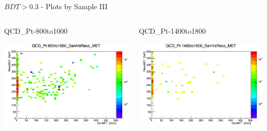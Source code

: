 \documentclass[8pt]{beamer}
\begin{document}
\begin{frame}{$BDT>0.3$ - Plots by Sample III}

\begin{columns}

\begin{block}{QCD\_Pt-800to1000}
 
\centering
\includegraphics[width=\linewidth]{img/QCD_Pt-800to1000_GenVsReco_MET.png} 
 
\end{block}

\begin{block}{QCD\_Pt-1400to1800}
 
\centering
\includegraphics[width=\linewidth]{img/QCD_Pt-1400to1800_GenVsReco_MET.png} 
 
\end{block}



\end{columns}
\end{frame}
\end{document}
